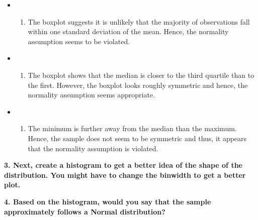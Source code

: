 \documentclass[
]{book}
\providecommand{\tightlist}{%
  \setlength{\itemsep}{0pt}\setlength{\parskip}{0pt}}
\begin{document}
\begin{itemize}
\item
  \begin{enumerate}
  \def\labelenumi{(\Alph{enumi})}
  \tightlist
  \item
    The boxplot suggests it is unlikely that the majority of observations fall within one standard deviation of the mean. Hence, the normality assumption seems to be violated.\\
  \end{enumerate}
\item
  \begin{enumerate}
  \def\labelenumi{(\Alph{enumi})}
  \setcounter{enumi}{1}
  \tightlist
  \item
    The boxplot shows that the median is closer to the third quartile than to the first. However, the boxplot looks roughly symmetric and hence, the normality assumption seems appropriate.\\
  \end{enumerate}
\item
  \begin{enumerate}
  \def\labelenumi{(\Alph{enumi})}
  \setcounter{enumi}{2}
  \tightlist
  \item
    The minimum is further away from the median than the maximum. Hence, the sample does not seem to be symmetric and thus, it appears that the normality assumption is violated.
  \end{enumerate}
\end{itemize}

\textbf{3. Next, create a histogram to get a better idea of the shape of the distribution. You might have to change the binwidth to get a better plot.}

\textbf{4. Based on the histogram, would you say that the sample approximately follows a Normal distribution?}
\end{document}
